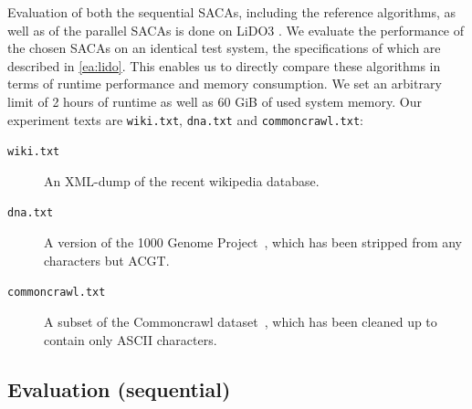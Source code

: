 \noindent
Evaluation of both the sequential SACAs, including the reference algorithms, as well as of the parallel SACAs is done on LiDO3 .
We evaluate the performance of the chosen SACAs on an identical test system, the specifications of which are described in \cref{ea:lido}.
This enables us to directly compare these algorithms in terms of runtime performance and memory consumption.
We set an arbitrary limit of 2 hours of runtime as well as 60 GiB of used system memory.
Our experiment texts are \texttt{wiki.txt}, \texttt{dna.txt} and \texttt{commoncrawl.txt}:
%
\begin{description}
    \item[\texttt{wiki.txt}] An XML-dump of the recent wikipedia database.
    \item[\texttt{dna.txt}] A version of the 1000 Genome Project~\cite{1000genomeproject}, which has been stripped from any characters but ACGT.
    \item[\texttt{commoncrawl.txt}] A subset of the Commoncrawl dataset~\cite{commoncrawl}, which has been cleaned up to contain only ASCII characters.
\end{description}

\subsection{Evaluation (sequential)}


